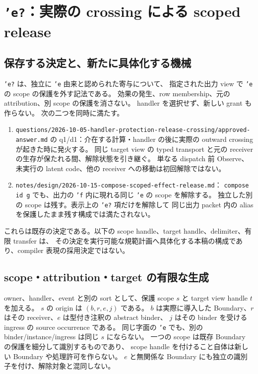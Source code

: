 \documentclass[11pt,a4paper]{article}
\begin{document}
\section{\texttt{'e?}：実際の crossing による scoped release}
\label{sec:release}

\subsection{保存する決定と、新たに具体化する機械}

\texttt{'e?} は、独立に \texttt{'e} 由来と認められた寄与について、
指定された出力 view で \texttt{'e} の scope の保護を外す記法である。
効果の発生、row membership、元の attribution、別 scope の保護を消さない。
handler を選択せず、新しい grant も作らない。
次の二つを同時に満たす。
\begin{enumerate}
\item \nolinkurl{questions/2026-10-05-handler-protection-release-crossing/approved-answer.md}
の q1/d1：介在する計算・handler の後に実際の outward crossing が起きた時に発火する。
同じ target view の typed transport と元の receiver の生存が保たれる間、解除状態を引き継ぐ。
単なる dispatch 前 Observe、未実行の latent code、他の receiver への移動は初回解除ではない。
\item \nolinkurl{notes/design/2026-10-15-compose-scoped-effect-release.md}：
\texttt{compose id g} でも、出力の \texttt{'f} 内に現れる同じ \texttt{'e} の scope を解除する。
独立した別の scope は残す。表示上の \texttt{'e?} 項だけを解除して
同じ出力 packet 内の alias を保護したまま残す構成では満たされない。
\end{enumerate}
これらは既存の決定である。以下の scope handle、target handle、delimiter、有限 transfer は、
その決定を実行可能な規範計画へ具体化する本稿の構成であり、compiler 表現の採用決定ではない。

\subsection{scope・attribution・target の有限な生成}

owner、handler、event と別の sort として、保護 scope \(s\) と target view handle \(t\) を加える。
\(s\) の origin は \((b,r,e,j)\) である。
\(b\) は実際に導入した Boundary、\(r\) はその receiver、\(e\) は型付き注釈の abstract binder、
\(j\) はその binder を受ける ingress の source occurrence である。
同じ字面の \texttt{'e} でも、別の binder/instance/ingress は同じ \(s\) にならない。
一つの scope は既存 Boundary の保護を細分して識別するものであり、
scope handle を付けること自体は新しい Boundary や処理許可を作らない。
\(e\) と無関係な Boundary にも独立の識別子を付け、解除対象と混同しない。
\end{document}
